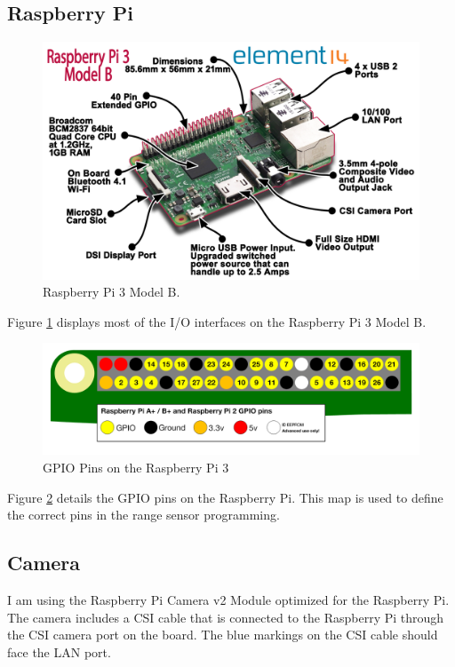 \subsection{Raspberry Pi}

\begin{figure}[H]
  \centering
  \includegraphics[width=1\textwidth]{fig/pi3}
  \caption{Raspberry Pi 3 Model B. \cite{pi3}}
  \label{fig:pi3}
\end{figure}

Figure \ref{fig:pi3} displays most of the I/O interfaces on the Raspberry Pi 3 Model B.

\begin{figure}[H]
  \centering
  \includegraphics[width=1\textwidth]{fig/gpio}
  \caption{GPIO Pins on the Raspberry Pi 3\cite{rpi}}
  \label{fig:gpio}
\end{figure}

Figure \ref{fig:gpio} details the GPIO pins on the Raspberry Pi. This map is used to define the correct pins in the range sensor programming. 

\newpage
\subsection{Camera}
I am using the Raspberry Pi Camera v2 Module optimized for the Raspberry Pi. The camera includes a CSI cable that is connected to the Raspberry Pi through the CSI camera port on the board. The blue markings on the CSI cable should face the LAN port.

